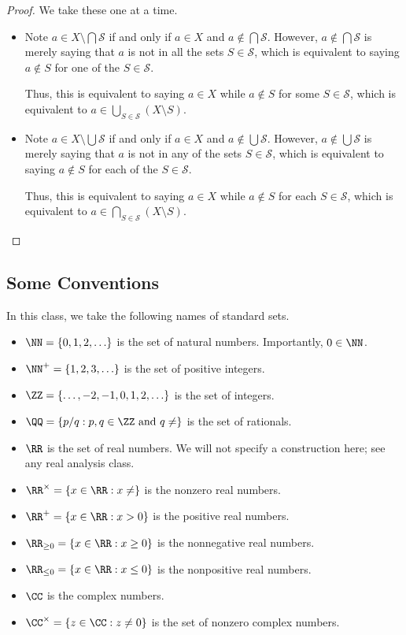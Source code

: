 \begin{proof}
	We take these one at a time.
	\begin{itemize}
		\item Note $a\in X\setminus\bigcap\mathcal S$ if and only if $a\in X$ and $a\notin\bigcap\mathcal S$. However, $a\notin\bigcap\mathcal S$ is merely saying that $a$ is not in all the sets $S\in\mathcal S$, which is equivalent to saying $a\notin S$ for one of the $S\in\mathcal S$.

		Thus, this is equivalent to saying $a\in X$ while $a\notin S$ for some $S\in\mathcal S$, which is equivalent to $a\in\bigcup_{S\in\mathcal S}(X\setminus S)$.
		\item Note $a\in X\setminus\bigcup\mathcal S$ if and only if $a\in X$ and $a\notin\bigcup\mathcal S$. However, $a\notin\bigcup\mathcal S$ is merely saying that $a$ is not in any of the sets $S\in\mathcal S$, which is equivalent to saying $a\notin S$ for each of the $S\in\mathcal S$.

		Thus, this is equivalent to saying $a\in X$ while $a\notin S$ for each $S\in\mathcal S$, which is equivalent to $a\in\bigcap_{S\in\mathcal S}(X\setminus S)$.
		\qedhere
	\end{itemize}
\end{proof}

\subsection{Some Conventions}
In this class, we take the following names of standard sets.
\begin{itemize}
	\item $\NN=\{0,1,2,\ldots\}$ is the set of natural numbers. Importantly, $0\in\NN$.
	\item $\NN^+=\{1,2,3,\ldots\}$ is the set of positive integers.
	\item $\ZZ=\{\ldots,-2,-1,0,1,2,\ldots\}$ is the set of integers.
	\item $\QQ=\{p/q:p,q\in\ZZ\text{ and }q\ne\}$ is the set of rationals.
	\item $\RR$ is the set of real numbers. We will not specify a construction here; see any real analysis class.
	\item $\RR^\times=\{x\in\RR:x\ne\}$ is the nonzero real numbers.
	\item $\RR^+=\{x\in\RR:x>0\}$ is the positive real numbers.
	\item $\RR_{\ge0}=\{x\in\RR:x\ge0\}$ is the nonnegative real numbers.
	\item $\RR_{\le0}=\{x\in\RR:x\le0\}$ is the nonpositive real numbers.
	\item $\CC$ is the complex numbers.
	\item $\CC^\times=\{z\in\CC:z\ne0\}$ is the set of nonzero complex numbers.
\end{itemize}

